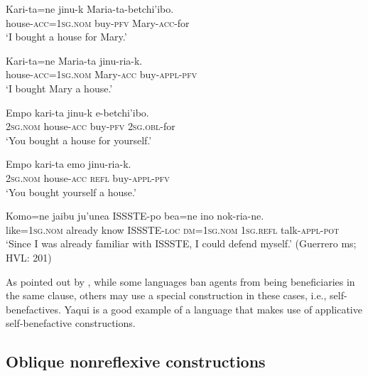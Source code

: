 \documentclass[output=paper]{langscibook}
\begin{document}
\ea%
    \label{ex:guerrero:20}

\ea
\label{ex:guerrero:20a}
\gll Kari-ta=ne   jinu-k Maria-ta-betchi’ibo.\\
  house\textsc{{}-acc}=\textsc{1sg.nom} buy-\textsc{pfv}   Mary-\textsc{acc}{}-for\\
  \glt   ‘I bought a house for Mary.’

\ex
\label{ex:guerrero:20b}
\gll Kari-ta=ne    Maria-ta  jinu-ria-k.\\
  house\textsc{{}-acc}=\textsc{1sg.nom}  Mary-\textsc{acc}   buy-\textsc{appl-pfv}\\
\glt ‘I bought Mary a house.’

\ex
\label{ex:guerrero:20c}
\gll Empo kari-ta jinu-k  e-betchi’ibo.\\
    \textsc{2sg.nom} house\textsc{{}-acc}  buy-\textsc{pfv} \textsc{2sg.obl}{}-for        \\
\glt ‘You bought a house for yourself.’

\ex
\label{ex:guerrero:20d}
\gll Empo kari-ta emo jinu-ria-k.\\
    \textsc{2sg.nom} house\textsc{{}-acc}  \textsc{refl} buy-\textsc{appl-pfv}    \\
\glt ‘You bought yourself a house.’

\ex
\label{ex:guerrero:20e}
\gll Komo=ne   jaibu  ju’unea   ISSSTE-po  bea=ne  ino   nok-ria-ne.\\
  like=\textsc{1sg.nom}  already   know   ISSSTE-\textsc{loc} \textsc{dm=1sg.nom}   \textsc{1sg.refl}   talk-\textsc{appl-pot}\\
\glt ‘Since I was already familiar with ISSSTE, I could defend myself.’
(Guerrero ms; HVL: 201)
\z
\z



As pointed out by \citet[4]{ZunigaKittilä2010}, while some languages ban agents from being beneficiaries in the same clause, others may use a special construction in these cases, i.e., self-benefactives. Yaqui is a good example of a language that makes use of applicative self-benefactive constructions.


\subsection{Oblique nonreflexive constructions}\label{sec:guerrero:3.4}
\end{document}
